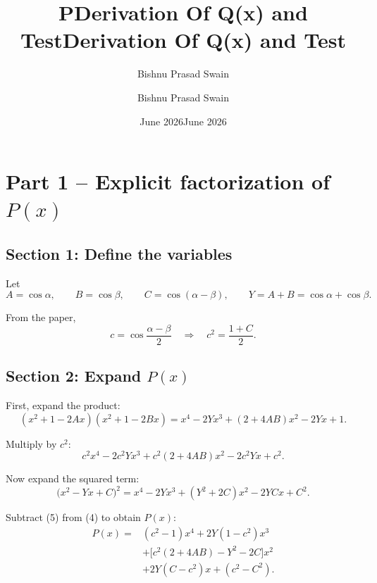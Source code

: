 \documentclass{article}
\title{PDerivation Of Q(x) and Test}
\author{Bishnu Prasad Swain}
\date{June 2026}
\begin{document}
\title{Derivation Of Q(x) and Test}
\author{Bishnu Prasad Swain}
\date{June 2026}
\maketitle

\bigskip

\section*{Part 1 -- Explicit factorization of \(P(x)\)}

\subsection*{Section 1: Define the variables}

Let
\begin{equation}
A=\cos\alpha,\qquad B=\cos\beta,\qquad C=\cos(\alpha-\beta),\qquad Y=A+B=\cos\alpha+\cos\beta.
\tag{1}
\end{equation}

From the paper,
\begin{equation}
c=\cos\frac{\alpha-\beta}{2}
\quad\Longrightarrow\quad
c^{2}=\frac{1+C}{2}.
\tag{2}
\end{equation}

\subsection*{Section 2: Expand \(P(x)\)}

First, expand the product:
\begin{equation}
(x^{2}+1-2Ax)(x^{2}+1-2Bx)
= x^{4}-2Yx^{3}+(2+4AB)x^{2}-2Yx+1.
\tag{3}
\end{equation}

Multiply by \(c^{2}\):
\begin{equation}
c^{2}x^{4}-2c^{2}Yx^{3}+c^{2}(2+4AB)x^{2}-2c^{2}Yx+c^{2}.
\tag{4}
\end{equation}

Now expand the squared term:
\begin{equation}
\bigl(x^{2}-Yx+C\bigr)^{2}
= x^{4}-2Yx^{3}+(Y^{2}+2C)x^{2}-2YCx+C^{2}.
\tag{5}
\end{equation}

Subtract (5) from (4) to obtain \(P(x)\):
\begin{equation}
\begin{aligned}
P(x)={}&(c^{2}-1)x^{4}
+2Y(1-c^{2})x^{3} \\
&+\bigl[c^{2}(2+4AB)-Y^{2}-2C\bigr]x^{2} \\
&+2Y(C-c^{2})x
+(c^{2}-C^{2}).
\end{aligned}
\tag{6}
\end{equation}
\end{document}

